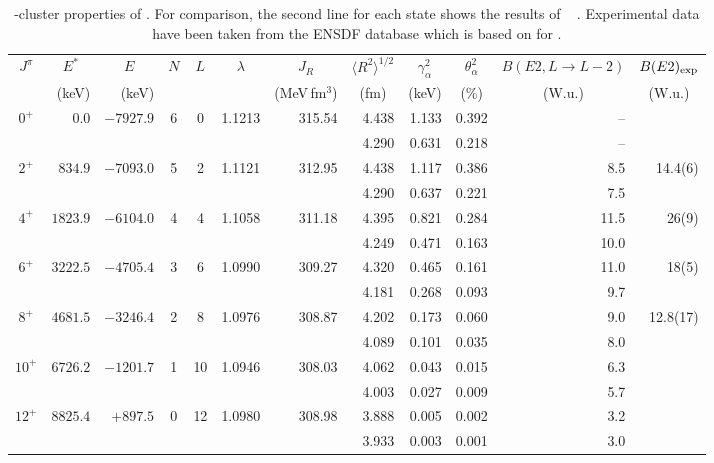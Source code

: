 %
\begin{table*}
\caption{\al -cluster properties of \criv . For comparison, the second line
  for each state shows the results of \SM\ \cite{Sou17} . Experimental data
  have been taken from the ENSDF database \cite{ENSDF} which is based on
  \cite{NDS54} for \criv . 
}
\label{tab:res_iv}
\begin{center}
\begin{tabular}{crrccrrrrrrr}
\hline
$J^\pi$ 
& \multicolumn{1}{c}{$E^\ast$} 
& \multicolumn{1}{c}{$E$} 
& $N$ & $L$ 
& \multicolumn{1}{c}{$\lambda$}
& \multicolumn{1}{c}{$J_R$} 
& \multicolumn{1}{c}{$\langle R^{2} \rangle^{1/2}$}
& \multicolumn{1}{c}{$\gamma_\alpha^2$}
& \multicolumn{1}{c}{$\theta_\alpha^2$}
& \multicolumn{1}{c}{$B(E2,L\rightarrow L-2)$}
& \multicolumn{1}{c}{$B(E2)_{\rm{exp}}$} \\
%
& (keV)
& (keV)
& & 
& 
& \multicolumn{1}{c}{(MeV\,fm$^3$)} 
& \multicolumn{1}{c}{(fm)}
& \multicolumn{1}{c}{(keV)}
& \multicolumn{1}{c}{(\%)}
& \multicolumn{1}{c}{(W.u.)}
& \multicolumn{1}{c}{(W.u.)} \\
%
\hline
%
$0^+$   &       $0.0$   &  $-7927.9$  &  6  &   0 & 1.1213  & 315.54 
&  4.438  & 1.133  & 0.392  & -- \\
& & & & & &
&  4.290  & 0.631  & 0.218  & -- \\
%
$2^+$   &     $834.9$   &  $-7093.0$  &  5  &   2 & 1.1121  & 312.95 
&  4.438  & 1.117  & 0.386  & 8.5 & 14.4(6)\\
& & & & & &
&  4.290  & 0.637  & 0.221  & 7.5 \\
%
$4^+$   &    $1823.9$   &  $-6104.0$  &  4  &   4 & 1.1058  & 311.18 
&  4.395  & 0.821  & 0.284  & 11.5 & 26(9)\\
& & & & & &
&  4.249  & 0.471  & 0.163  & 10.0 \\
%
$6^+$   &    $3222.5$   &  $-4705.4$  &  3  &   6 & 1.0990  & 309.27 
&  4.320  & 0.465  & 0.161  & 11.0 & 18(5)\\
& & & & & &
&  4.181  & 0.268  & 0.093  & 9.7 \\
%
$8^+$   &    $4681.5$   &  $-3246.4$  &  2  &   8 & 1.0976  & 308.87 
&  4.202  & 0.173  & 0.060  & 9.0 & 12.8(17)\\
& & & & & &
&  4.089  & 0.101  & 0.035  & 8.0 \\
%
$10^+$  &    $6726.2$   &  $-1201.7$  &  1  &  10 & 1.0946  & 308.03 
&  4.062  & 0.043  & 0.015  & 6.3 & \\
& & & & & &
&  4.003  & 0.027  & 0.009  & 5.7 \\
%
$12^+$  &    $8825.4$   &   $+897.5$  &  0  &  12 & 1.0980  & 308.98 
&  3.888  & 0.005  & 0.002  & 3.2 & \\
& & & & & &
&  3.933  & 0.003  & 0.001  & 3.0 \\
%
\hline
\end{tabular}
\end{center}
\end{table*}
%

